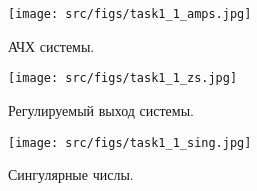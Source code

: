 \begin{figure}[ht!]
  \centering
  \texttt{[image: src/figs/task1\_1\_amps.jpg]}
  \caption{АЧХ системы.}
  \label{fig:task1_1_amps}
\end{figure}

\begin{figure}[ht!]
  \centering
  \texttt{[image: src/figs/task1\_1\_zs.jpg]}
  \caption{Регулируемый выход системы.}
  \label{fig:task1_1_zs}
\end{figure}

\begin{figure}[ht!]
  \centering
  \texttt{[image: src/figs/task1\_1\_sing.jpg]}
  \caption{Сингулярные числы.}
  \label{fig:task1_1_sing}
\end{figure}

\FloatBarrier